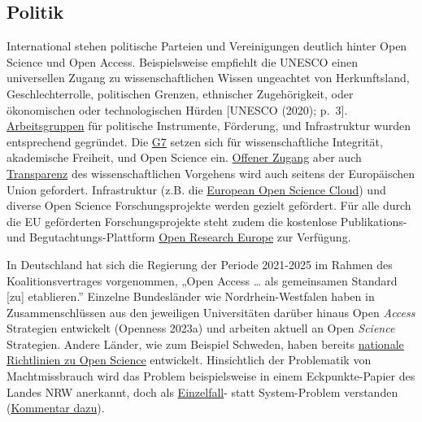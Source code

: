 \documentclass[
  letterpaper,
  DIV=11,
  numbers=noendperiod]{scrreprt}
\begin{document}
\subsection{Politik}\label{politik}

International stehen politische Parteien und Vereinigungen deutlich
hinter Open Science und Open Access. Beispielsweise empfiehlt die UNESCO
einen universellen Zugang zu wissenschaftlichen Wissen ungeachtet von
Herkunftsland, Geschlechterrolle, politischen Grenzen, ethnischer
Zugehörigkeit, oder ökonomischen oder technologischen Hürden {[}UNESCO
(2020); p.~3{]}.
\href{https://opusproject.eu/openscience-news/open-science-horizon-unescos-recommendation/}{Arbeitsgruppen}
für politische Instrumente, Förderung, und Infrastruktur wurden
entsprechend gegründet. Die
\href{G7\%20BEST\%20PRACTICES\%20FOR\%20SECURE\%20&\%20OPEN\%20RESEARCH\%20Security\%20and\%20Integrity\%20of\%20the\%20Global\%20Research\%20Ecosystem\%20(SIGRE)\%20Working\%20Group}{G7}
setzen sich für wissenschaftliche Integrität, akademische Freiheit, und
Open Science ein.
\href{https://www.consilium.europa.eu/en/press/press-releases/2023/05/23/council-calls-for-transparent-equitable-and-open-access-to-scholarly-publications/}{Offener
Zugang} aber auch
\href{Triggers\%20for\%20audits\%20of\%20good\%20laboratory\%20practice\%20(GLP)\%20studies}{Transparenz}
des wissenschaftlichen Vorgehens wird auch seitens der Europäischen
Union gefordert. Infrastruktur (z.B. die
\href{https://eosc-portal.eu}{European Open Science Cloud}) und diverse
Open Science Forschungsprojekte werden gezielt gefördert. Für alle durch
die EU geförderten Forschungsprojekte steht zudem die kostenlose
Publikations- und Begutachtungs-Plattform
\href{https://open-research-europe.ec.europa.eu}{Open Research Europe}
zur Verfügung.

In Deutschland hat sich die Regierung der Periode 2021-2025 im Rahmen
des Koalitionsvertrages vorgenommen, „Open Access \ldots{} als
gemeinsamen Standard {[}zu{]} etablieren.'' Einzelne Bundesländer wie
Nordrhein-Westfalen haben in Zusammenschlüssen aus den jeweiligen
Universitäten darüber hinaus Open \emph{Access} Strategien entwickelt
(Openness 2023a) und arbeiten aktuell an Open \emph{Science} Strategien.
Andere Länder, wie zum Beispiel Schweden, haben bereits
\href{https://www.kb.se/samverkan-och-utveckling/nytt-fran-kb/nyheter-samverkan-och-utveckling/2024-01-15-national-guidelines-for-promoting-open-science-in-sweden.html}{nationale
Richtlinien zu Open Science} entwickelt. Hinsichtlich der Problematik
von Machtmissbrauch wird das Problem beispielsweise in einem
Eckpunkte-Papier des Landes NRW anerkannt, doch als
\href{https://opal.landtag.nrw.de/portal/WWW/dokumentenarchiv/Dokument/MMV18-2422.pdf}{Einzelfall}-
statt System-Problem verstanden
(\href{https://www.jmwiarda.de/https-www.jmwiarda.de-2024-05-28-bitte-nachschaerfen/}{Kommentar
dazu}).
\end{document}
